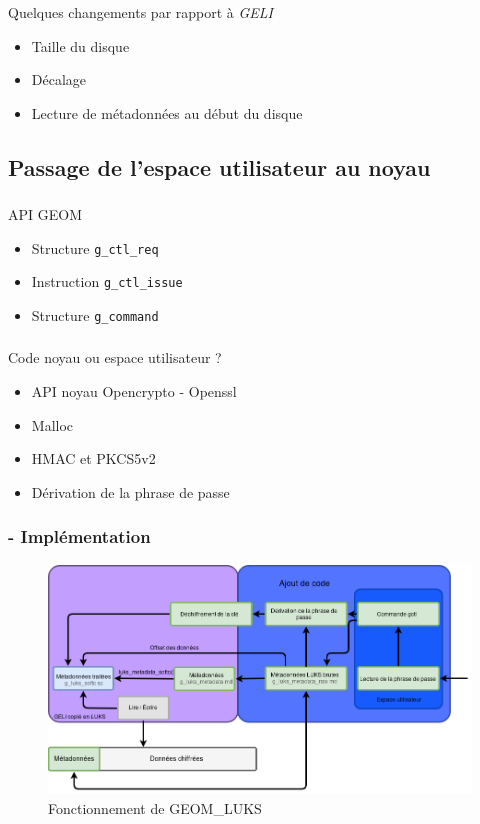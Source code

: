 \begin{frame}
	\frametitle{\insertsubsectionhead{}}
	\begin{block}{Quelques changements par rapport à \textit{GELI}}
		\begin{itemize}
			\item Taille du disque
				\pause
			\item Décalage
				\pause
			\item Lecture de métadonnées au début du disque
		\end{itemize}
	\end{block}
\end{frame}

\subsection{Passage de l'espace utilisateur au noyau}

\begin{frame}
	\frametitle{\insertsubsectionhead{}}
	\begin{block}{API GEOM}
		\begin{itemize}
			\item Structure \texttt{g\_ctl\_req}
			\item Instruction \texttt{g\_ctl\_issue}
			\item Structure \texttt{g\_command}
		\end{itemize}
	\end{block}
\end{frame}

\begin{frame}
	\frametitle{\insertsubsectionhead{}}
	\begin{block}{Code noyau ou espace utilisateur ?}
		\begin{itemize}
			\item API noyau Opencrypto - Openssl
			\item Malloc
			\item HMAC et PKCS5v2
			\item Dérivation de la phrase de passe
		\end{itemize}
	\end{block}
\end{frame}

\begin{frame}
	\frametitle{\insertsubsectionhead{} - Implémentation}
	\begin{figure}
		\includegraphics[width=\textwidth]{developpement/utilisation_metadonnee_luks_2}
		\caption{Fonctionnement de GEOM\_LUKS}
	\end{figure}
\end{frame}

